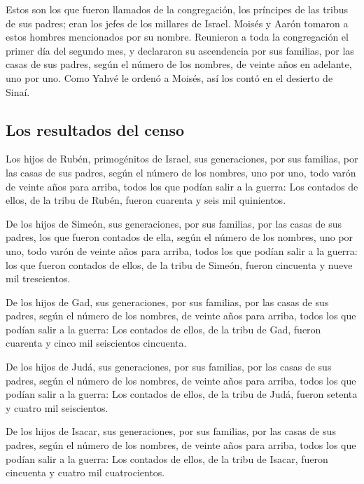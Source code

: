 \begin{paracol}{2}
 Estos son los que fueron llamados de la congregación,
los príncipes de las tribus de sus padres; eran los jefes de los
millares de Israel.  Moisés y Aarón tomaron a estos
hombres mencionados por su nombre.  Reunieron a toda la
congregación el primer día del segundo mes, y declararon su ascendencia
por sus familias, por las casas de sus padres, según el número de los
nombres, de veinte años en adelante, uno por uno.  Como
Yahvé le ordenó a Moisés, así los contó en el desierto de Sinaí.

\hypertarget{los-resultados-del-censo}{%
\subsection{Los resultados del censo}\label{los-resultados-del-censo}}

 Los hijos de Rubén, primogénitos de Israel, sus
generaciones, por sus familias, por las casas de sus padres, según el
número de los nombres, uno por uno, todo varón de veinte años para
arriba, todos los que podían salir a la guerra:  Los
contados de ellos, de la tribu de Rubén, fueron cuarenta y seis mil
quinientos.

 De los hijos de Simeón, sus generaciones, por sus
familias, por las casas de sus padres, los que fueron contados de ella,
según el número de los nombres, uno por uno, todo varón de veinte años
para arriba, todos los que podían salir a la guerra:  los
que fueron contados de ellos, de la tribu de Simeón, fueron cincuenta y
nueve mil trescientos.

 De los hijos de Gad, sus generaciones, por sus familias,
por las casas de sus padres, según el número de los nombres, de veinte
años para arriba, todos los que podían salir a la guerra:
 Los contados de ellos, de la tribu de Gad, fueron
cuarenta y cinco mil seiscientos cincuenta.

 De los hijos de Judá, sus generaciones, por sus
familias, por las casas de sus padres, según el número de los nombres,
de veinte años para arriba, todos los que podían salir a la guerra:
 Los contados de ellos, de la tribu de Judá, fueron
setenta y cuatro mil seiscientos.

 De los hijos de Isacar, sus generaciones, por sus
familias, por las casas de sus padres, según el número de los nombres,
de veinte años para arriba, todos los que podían salir a la guerra:
 Los contados de ellos, de la tribu de Isacar, fueron
cincuenta y cuatro mil cuatrocientos.


\end{paracol}
